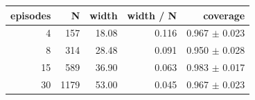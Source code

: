 \begin{tabular}{rrrrr}
\toprule
episodes & N & width & width / N & coverage \\
\midrule
4 & 157 & 18.08 & 0.116 & 0.967 $\pm$ 0.023 \\
8 & 314 & 28.48 & 0.091 & 0.950 $\pm$ 0.028 \\
15 & 589 & 36.90 & 0.063 & 0.983 $\pm$ 0.017 \\
30 & 1179 & 53.00 & 0.045 & 0.967 $\pm$ 0.023 \\
\bottomrule
\end{tabular}
\par{}
